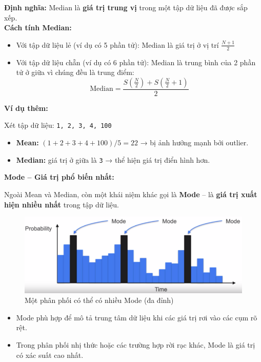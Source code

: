 \documentclass[11pt]{article}
\begin{document}
\textbf{Định nghĩa:} Median là \textbf{giá trị trung vị} trong một tập dữ liệu đã được sắp xếp.\\

\textbf{Cách tính Median:}
\begin{itemize}
    \item Với tập dữ liệu lẻ (ví dụ có 5 phần tử): Median là giá trị ở vị trí $\frac{N+1}{2}$
    \item Với tập dữ liệu chẵn (ví dụ có 6 phần tử): Median là trung bình của 2 phần tử ở giữa vì chúng đều là trung điểm:
    \[
    \text{Median} = \frac{S\left( \frac{N}{2} \right) + S\left( \frac{N}{2} + 1 \right)}{2}
    \]
\end{itemize}

\vspace{1em}

\textbf{Ví dụ thêm:}

Xét tập dữ liệu: \texttt{1, 2, 3, 4, 100}

\begin{itemize}
    \item \textbf{Mean:} $(1 + 2 + 3 + 4 + 100)/5 = 22$ → bị ảnh hưởng mạnh bởi outlier.
    \item \textbf{Median:} giá trị ở giữa là \texttt{3} → thể hiện giá trị điển hình hơn.
\end{itemize}

\vspace{1em}

\textbf{Mode – Giá trị phổ biến nhất:}

Ngoài Mean và Median, còn một khái niệm khác gọi là \textbf{Mode} – là \textbf{giá trị xuất hiện nhiều nhất} trong tập dữ liệu.

\begin{figure}[H]
    \centering
    \includegraphics[width=0.6\linewidth]{images/mode_multimodal.png}
    \caption{Một phân phối có thể có nhiều Mode (đa đỉnh)}
\end{figure}

\begin{itemize}
    \item Mode phù hợp để mô tả trung tâm dữ liệu khi các giá trị rơi vào các cụm rõ rệt.
    \item Trong phân phối nhị thức hoặc các trường hợp rời rạc khác, Mode là giá trị có xác suất cao nhất.
\end{itemize}
\end{document}
